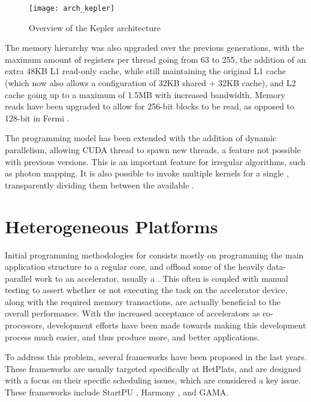 \documentclass[main.tex]{subfiles}
\begin{document}
\begin{figure}
  \centering
  \texttt{[image: arch\_kepler]}
  \caption{Overview of the Kepler architecture \label{fig:kepler}}
\end{figure}

The memory hierarchy was also upgraded over the previous generations, with the maximum amount of registers per thread going from 63 to 255, the addition of an extra 48KB L1 read-only cache, while still maintaining the original L1 cache (which now also allows a configuration of 32KB shared + 32KB cache), and L2 cache going up to a maximum of 1.5MB with increased bandwidth. Memory reads have been upgraded to allow for 256-bit blocks to be read, as opposed to 128-bit in Fermi \cite{NVIDIA:kepler}.

The programming model has been extended with the addition of dynamic parallelism, allowing \acs{CUDA} thread to spawn new threads, a feature not possible with previous versions. This is an important feature for irregular algorithms, such as photon mapping. It is also possible to invoke multiple kernels for a single \gpu, transparently dividing them between the available \smxs.






\section{Heterogeneous Platforms}

Initial programming methodologies for \hetplats consists mostly on programming the main application structure to a regular \cpu core, and offload some of the heavily data-parallel work to an accelerator, usually a \gpu. This often is coupled with manual testing to assert whether or not executing the task on the accelerator device, along with the required memory transactions, are actually beneficial to the overall performance.
With the increased acceptance of accelerators as co-processors, development efforts have been made towards making this development process much easier, and thus produce more, and better applications.

To address this problem, several frameworks have been proposed in the last years. These frameworks are usually targeted specifically at \acp{HetPlat}, and are designed with a focus on their specific scheduling issues, which are considered a key issue. These frameworks include StartPU \cite{augonnet2011starpu}, Harmony \cite{diamos2008harmony}, and GAMA. 
\end{document}
